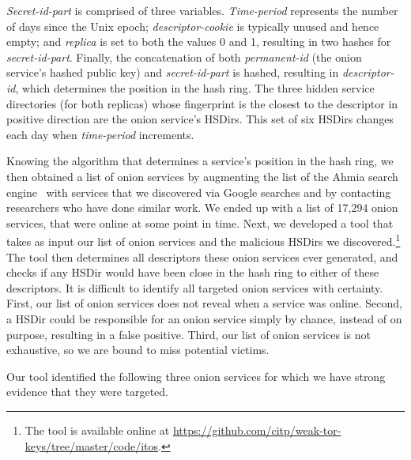 \textit{Secret-id-part} is comprised of three variables.  \textit{Time-period}
represents the number of days since the Unix epoch; \textit{descriptor-cookie}
is typically unused and hence empty; and \textit{replica} is set to both the
values 0 and 1, resulting in two hashes for \textit{secret-id-part}.  Finally,
the concatenation of both \textit{permanent-id} (the onion service's hashed
public key) and \textit{secret-id-part} is hashed, resulting in
\textit{descriptor-id}, which determines the position in the hash ring.  The
three hidden service directories (for both replicas) whose fingerprint is the
closest to the descriptor in positive direction are the onion service's HSDirs.
This set of six HSDirs changes each day when \textit{time-period} increments.

Knowing the algorithm that determines a service's position in the hash ring, we
then obtained a list of onion services by augmenting the list of the Ahmia
search engine~\cite{ahmia} with services that we discovered via Google searches
and by contacting researchers who have done similar work.  We ended up with a
list of 17,294 onion services, that were online at some point in time.  Next, we
developed a tool that takes as input our list of onion services and the
malicious HSDirs we discovered.\footnote{The tool is available online at
\url{https://github.com/citp/weak-tor-keys/tree/master/code/itos}.}  The tool
then determines all descriptors these onion services ever generated, and checks
if any HSDir would have been close in the hash ring to either of these
descriptors. It is difficult to identify all targeted onion services with
certainty.  First, our list of onion services does not reveal when a service was
online.  Second, a HSDir could be responsible for an onion service simply by
chance, instead of on purpose, resulting in a false positive.  Third, our list
of onion services is not exhaustive, so we are bound to miss potential victims.

Our tool identified the following three onion services for which we have strong
evidence that they were targeted.

